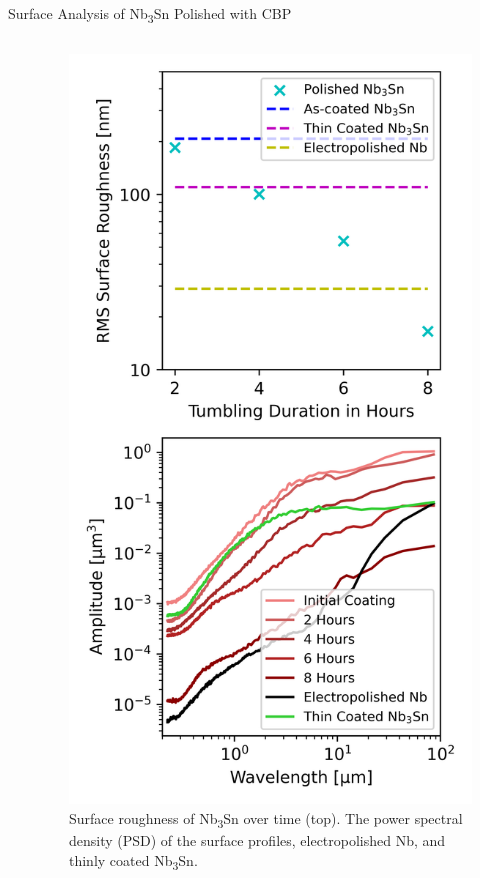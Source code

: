 \documentclass{beamer}
\begin{document}
\begin{frame}{}
\begin{columns}[t]
\begin{column}{0.32\linewidth}
\begin{block}{\label{sec:samplestudy}Surface Analysis of Nb\textsubscript{3}Sn Polished with CBP}
\begin{columns}[t]
\begin{column}{0.42\columnwidth}
                        \end{column}
                        \begin{column}{0.52\columnwidth}
                             \begin{figure}[t]
                                \centering
                                \includegraphics[width=\columnwidth]{../doc/figs/Surface_Roughness_Graph.png}
                                \caption{\label{fig:surfaceroughnessgraph}Surface roughness of Nb\textsubscript{3}Sn over time (top). The power spectral density (PSD) of the surface profiles, electropolished Nb, and thinly coated Nb\textsubscript{3}Sn\cite{posen2021advances}.}
                            \end{figure}
                        \end{column}


\end{columns}
\end{block}
\end{column}
\end{columns}
\end{frame}
\end{document}

